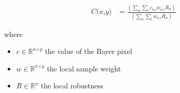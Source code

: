 \documentclass[12pt]{article}
\begin{document}
\begin{align*}
\textit{C(x,y)} & = \frac{\left( \sum_\textit{n} \sum_\textit{i} \textit{c}_{\textit{n}, \textit{i}}\textit{w}_{\textit{n}, \textit{i}}\textit{R̂}_{ \textit{n} } \right)}{\left( \sum_\textit{n} \sum_\textit{i} \textit{w}_{\textit{n}, \textit{i}}\textit{R̂}_{ \textit{n} } \right)}
\end{align*}

where
\begin{itemize}
\item $\textit{c} \in \mathbb{R}^{ \textit{x} \times \textit{y} }$ the value of the Bayer pixel
\item $\textit{w} \in \mathbb{R}^{ \textit{x} \times \textit{y} }$ the local sample weight
\item $\textit{R̂} \in \mathbb{R}^{ \textit{x}}$ the local robustness
\end{itemize}
\end{document}
